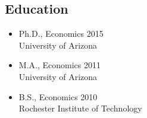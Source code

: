 \documentclass[12pt]{res} %
\begin{document}
\begin{resume}
\subsection{Education}


	\begin{itemize}
		\item[] Ph.D., Economics \hfill 2015\\
		University of Arizona

		\item[] M.A., Economics \hfill 2011\\
		University of Arizona

		\item[] B.S.,  Economics \hfill 2010\\
		Rochester Institute of Technology

	\end{itemize}
\vspace{-.2in}

\end{resume}
\end{document}
